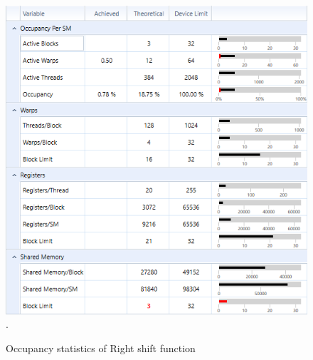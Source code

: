 \documentclass[oneside,openright,12pt,final,en]{mgr}
\begin{document}
\begin{figure}[H]
	\centering
	\includegraphics[width=\textwidth]{rightshift_occupancy}.
	\caption{Occupancy statistics of Right shift function}
	\label{fig:rightshift_occupancy}
\end{figure}
\end{document}

